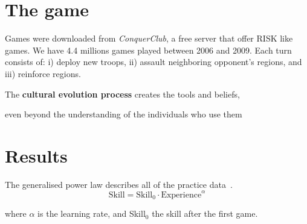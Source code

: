 \documentclass[a0,portrait]{a0poster}
\begin{document}
\begin{multicols}{2}
\section*{The game}


Games were downloaded from \emph{ConquerClub}, a free server that offer RISK like games.
We have 4.4 millions games played between 2006 and 2009. 
Each turn consists of: i) deploy new troops, ii) assault neighboring opponent's regions, and iii) reinforce regions.

% 
\vspace{0.5cm}
\begin{mdframed}[backgroundcolor=gray!15] 
\vspace{0.5cm}
\Large \centering
The \textbf{cultural evolution process} creates the tools and beliefs,

even beyond the understanding of the individuals who use them
\vspace{0.5cm}
\end{mdframed}


\vspace{-1cm}
\section*{Results}

The generalised power law describes all of the practice data~\cite{newell1981-skillAcquisitionAndLawOfPractice}.
\begin{equation}\label{lawOfPractice}
   \text{Skill} = \text{Skill}_0 \cdot \text{Experience}^{\alpha}
\end{equation} 

where $\alpha$ is the learning rate, and Skill$_0$ the skill after the first game.


\end{multicols}
\end{document}
